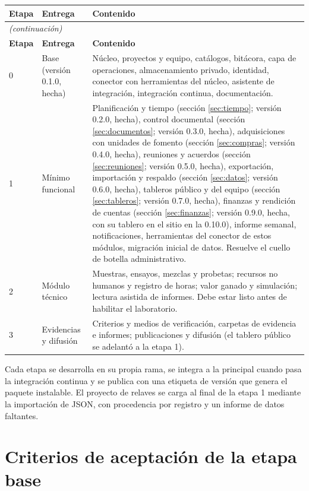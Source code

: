 \documentclass[11pt,a4paper]{article}
\newcommand{\continuacion}[1]{\multicolumn{#1}{l}{\small\itshape (continuación)}\\}
\begin{document}
\begin{longtable}{p{1.2cm}p{4.2cm}p{9.4cm}}
\toprule
\textbf{Etapa} & \textbf{Entrega} & \textbf{Contenido} \\
\midrule
\endfirsthead
\continuacion{3}
\toprule
\textbf{Etapa} & \textbf{Entrega} & \textbf{Contenido} \\
\midrule
\endhead
0 & Base (versión 0.1.0, hecha) & Núcleo, proyectos y equipo, catálogos, bitácora, capa de operaciones, almacenamiento privado, identidad, conector con herramientas del núcleo, asistente de integración, integración continua, documentación. \\
1 & Mínimo funcional & Planificación y tiempo (sección \ref{sec:tiempo}; versión 0.2.0, hecha), control documental (sección \ref{sec:documentos}; versión 0.3.0, hecha), adquisiciones con unidades de fomento (sección \ref{sec:compras}; versión 0.4.0, hecha), reuniones y acuerdos (sección \ref{sec:reuniones}; versión 0.5.0, hecha), exportación, importación y respaldo (sección \ref{sec:datos}; versión 0.6.0, hecha), tableros público y del equipo (sección \ref{sec:tableros}; versión 0.7.0, hecha), finanzas y rendición de cuentas (sección \ref{sec:finanzas}; versión 0.9.0, hecha, con su tablero en el sitio en la 0.10.0), informe semanal, notificaciones, herramientas del conector de estos módulos, migración inicial de datos. Resuelve el cuello de botella administrativo. \\
2 & Módulo técnico & Muestras, ensayos, mezclas y probetas; recursos no humanos y registro de horas; valor ganado y simulación; lectura asistida de informes. Debe estar listo antes de habilitar el laboratorio. \\
3 & Evidencias y difusión & Criterios y medios de verificación, carpetas de evidencia e informes; publicaciones y difusión (el tablero público se adelantó a la etapa 1). \\
\bottomrule
\end{longtable}

Cada etapa se desarrolla en su propia rama, se integra a la principal cuando pasa la integración continua y se publica con una etiqueta de versión que genera el paquete instalable. El proyecto de relaves se carga al final de la etapa 1 mediante la importación de JSON, con procedencia por registro y un informe de datos faltantes.

\section{Criterios de aceptación de la etapa base}
\end{document}
